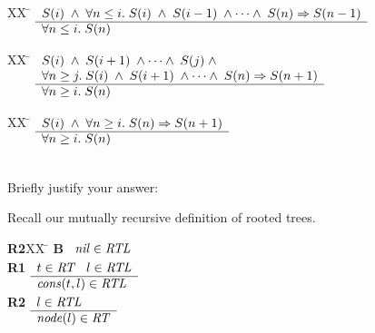 \documentclass[addpoints]{exam}
\begin{document}
\begin{questions}
\begin{parts}
\begin{tabbing}
[b]XX \=  \kill
[b] \>
	\(\begin{array}[t]{l}
	S(i) \;\wedge\; \forall n \leq i.\;S(i)\;\wedge\;S(i-1)\;\wedge\cdots\wedge\;S(n) \Rightarrow S(n-1) \\
	\hline
	\forall n \leq i. \; S(n)
	\end{array}\)
\end{tabbing}


\begin{tabbing}
[c]XX \=  \kill
[c] \>
	\(\begin{array}[t]{l}
	S(i) \;\wedge\; S(i+1)\;\wedge\cdots\wedge\;S(j)\;\wedge\; \\
\forall n \geq j.\;S(i)\;\wedge\;S(i+1)\;\wedge\cdots\wedge\;S(n) \Rightarrow S(n+1) \\
	\hline
	\forall n \geq i. \; S(n)
	\end{array}\) %
\end{tabbing}

\begin{tabbing}
[d]XX \=  \kill
[d] \>
	\(\begin{array}[t]{l}
	S(i) \;\wedge\; \forall n \geq i.\;S(n) \Rightarrow S(n+1) \\
	\hline
	\forall n \geq i. \; S(n)
	\end{array}\) %
\end{tabbing}
~\\Briefly justify your answer:
\end{parts}




\vspace{25mm}
\clearpage



\vspace{25mm}



\vspace{25mm}

\question[3] 
Recall our mutually recursive definition of rooted trees.
\begin{tabbing}
{\bf R2}XX \=  \kill
{\bf B} \>
        \(\begin{array}[t]{l}
        \mbox{\it nil\/}\in\mbox{\it RTL\/}
        \end{array}\) \\[2ex]
{\bf R1} \>
        \(\begin{array}[t]{l}
        t\in\mbox{\it RT\/}\;\;\;l\in\mbox{\it RTL\/} \\
        \hline
        \mbox{\it cons\/}(t,l)\in\mbox{\it RTL\/}
        \end{array}\) \\[2ex]
{\bf R2} \>
        \(\begin{array}[t]{l}
        l\in\mbox{\it RTL\/} \\
        \hline
        \mbox{\it node\/}(l)\in\mbox{\it RT\/}
        \end{array}\)
\end{tabbing}


\end{questions}
\end{document}
